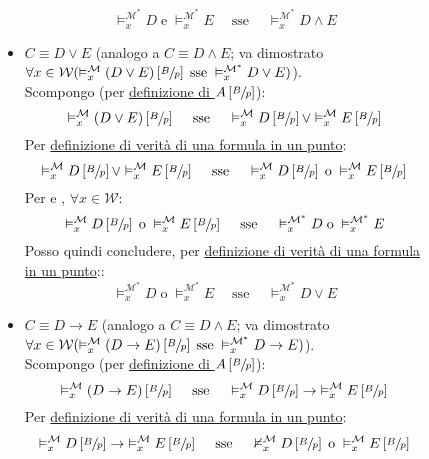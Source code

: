 \documentclass[a4paper,12pt]{article}
\newcommand{\latinmodern}[1]{\text{#1}}
\newcommand{\latinmath}[1]{\text{\latinmodern{#1}}} %
\begin{document}
\begin{description}
\begin{dimo}
\begin{dimo}
\begin{description}
\begin{itemize}
					                  $$\vDash_x^{\mathcal{M^{\ast}}} D \; \text{e} \; \vDash_x^{\mathcal{M^{\ast}}} E \quad\; \text{sse} \quad\; \vDash_x^{\mathcal{M^{\ast}}} D \land E$$
					            \item $C \equiv D \lor E$ (analogo a $C \equiv D \land E$; va dimostrato \emph{$\forall x \in \mathcal{W} (\vDash_x^{\mathcal{M}} (D \lor E)\left[\sfrac{B}{p}\right] \; \text{sse} \; \vDash_x^{\mathcal{M^{\ast}}} D \lor E)$}). \\
					                  Scompongo (per \hyperlink{defsu}{definizione di $A \left[\sfrac{B}{p}\right]$}):
					                  $$\vDash_x^{\mathcal{M}} (D \lor E)\left[\sfrac{B}{p}\right] \quad \; \text{sse} \quad\; \vDash_x^{\mathcal{M}} D\left[\sfrac{B}{p}\right] \lor \vDash_x^{\mathcal{M}} E\left[\sfrac{B}{p}\right] $$
					                  Per \hyperlink{defverp}{definizione di verità di una formula in un punto}:
					                  $$\vDash_x^{\mathcal{M}} D\left[\sfrac{B}{p}\right] \lor \vDash_x^{\mathcal{M}} E\left[\sfrac{B}{p}\right] \quad\; \text{sse} \quad\; \vDash_x^{\mathcal{M}} D\left[\sfrac{B}{p}\right] \; \text{o} \; \vDash_x^{\mathcal{M}} E\left[\sfrac{B}{p}\right]$$
					                  Per \latinmath{IH1} e \latinmath{IH2}, $\forall x \in \mathcal{W}$:
					                  $$\vDash_x^{\mathcal{M}} D\left[\sfrac{B}{p}\right] \; \text{o} \; \vDash_x^{\mathcal{M}} E\left[\sfrac{B}{p}\right] \quad\; \text{sse} \quad\; \vDash_x^{\mathcal{M^{\ast}}} D \; \text{o} \; \vDash_x^{\mathcal{M^{\ast}}} E$$
					                  Posso quindi concludere, per \hyperlink{defverp}{definizione di verità di una formula in un punto}::
					                  $$\vDash_x^{\mathcal{M^{\ast}}} D \; \text{o} \; \vDash_x^{\mathcal{M^{\ast}}} E \quad\; \text{sse} \quad\; \vDash_x^{\mathcal{M^{\ast}}} D \lor E$$
					            \item $C \equiv D \to E$ (analogo a $C \equiv D \land E$; va dimostrato \emph{$\forall x \in \mathcal{W} (\vDash_x^{\mathcal{M}} (D \to E)\left[\sfrac{B}{p}\right] \; \text{sse} \; \vDash_x^{\mathcal{M^{\ast}}} D \to E)$}). \\
					                  Scompongo (per \hyperlink{defsu}{definizione di $A \left[\sfrac{B}{p}\right]$}):
					                  $$\vDash_x^{\mathcal{M}} (D \to E)\left[\sfrac{B}{p}\right] \quad \; \text{sse} \quad\; \vDash_x^{\mathcal{M}} D\left[\sfrac{B}{p}\right] \to \; \vDash_x^{\mathcal{M}} E\left[\sfrac{B}{p}\right] $$
					                  Per \hyperlink{defverp}{definizione di verità di una formula in un punto}:
					                  $$\vDash_x^{\mathcal{M}} D\left[\sfrac{B}{p}\right] \to \; \vDash_x^{\mathcal{M}} E\left[\sfrac{B}{p}\right] \quad\; \text{sse} \quad\; \nvDash_x^{\mathcal{M}} D\left[\sfrac{B}{p}\right] \; \text{o} \; \vDash_x^{\mathcal{M}} E\left[\sfrac{B}{p}\right]$$

\end{itemize}
\end{description}
\end{dimo}
\end{dimo}
\end{description}
\end{document}
